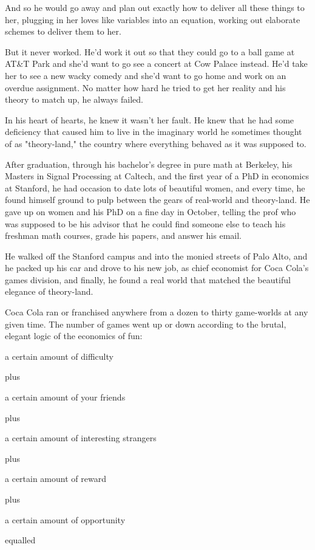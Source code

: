 And so he would go away and plan out exactly how to deliver all
these things to her, plugging in her loves like variables into an
equation, working out elaborate schemes to deliver them to her.

But it never worked. He'd work it out so that they could go to a
ball game at AT\&T Park and she'd want to go see a concert at Cow
Palace instead. He'd take her to see a new wacky comedy and she'd
want to go home and work on an overdue assignment. No matter how
hard he tried to get her reality and his theory to match up, he
always failed.

In his heart of hearts, he knew it wasn't her fault. He knew that
he had some deficiency that caused him to live in the imaginary
world he sometimes thought of as "theory-land," the country where
everything behaved as it was supposed to.

After graduation, through his bachelor's degree in pure math at
Berkeley, his Masters in Signal Processing at Caltech, and the
first year of a PhD in economics at Stanford, he had occasion to
date lots of beautiful women, and every time, he found himself
ground to pulp between the gears of real-world and theory-land. He
gave up on women and his PhD on a fine day in October, telling the
prof who was supposed to be his advisor that he could find someone
else to teach his freshman math courses, grade his papers, and
answer his email.

He walked off the Stanford campus and into the monied streets of
Palo Alto, and he packed up his car and drove to his new job, as
chief economist for Coca Cola's games division, and finally, he
found a real world that matched the beautiful elegance of
theory-land.

Coca Cola ran or franchised anywhere from a dozen to thirty
game-worlds at any given time. The number of games went up or down
according to the brutal, elegant logic of the economics of fun:

a certain amount of difficulty

plus

a certain amount of your friends

plus

a certain amount of interesting strangers

plus

a certain amount of reward

plus

a certain amount of opportunity

equalled

